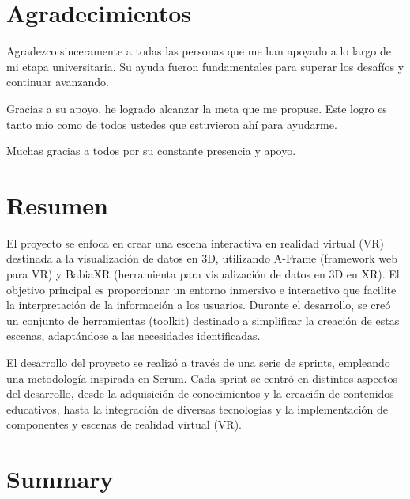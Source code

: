 \documentclass[a4paper, 12pt]{book}
\begin{document}
\chapter*{Agradecimientos}

Agradezco sinceramente a todas las personas que me han apoyado a lo largo de mi etapa universitaria. Su ayuda fueron fundamentales para superar los desafíos y continuar avanzando.

Gracias a su apoyo, he logrado alcanzar la meta que me propuse. Este logro es tanto mío como de todos ustedes que estuvieron ahí para ayudarme.

Muchas gracias a todos por su constante presencia y apoyo.


\chapter*{Resumen}


El proyecto se enfoca en crear una escena interactiva en realidad virtual (VR) destinada a la visualización de datos en 3D, utilizando A-Frame (framework web para VR) y BabiaXR (herramienta para visualización de datos en 3D en XR). El objetivo principal es proporcionar un entorno inmersivo e interactivo que facilite la interpretación de la información a los usuarios. 
Durante el desarrollo, se creó un conjunto de herramientas (toolkit) destinado a simplificar la creación de estas escenas, adaptándose a las necesidades identificadas.

El desarrollo del proyecto se realizó a través de una serie de sprints, empleando una metodología inspirada en Scrum. Cada sprint se centró en distintos aspectos del desarrollo, desde la adquisición de conocimientos y la creación de contenidos educativos, hasta la integración de diversas tecnologías y la implementación de componentes y escenas de realidad virtual (VR).


\chapter*{Summary}
\end{document}
